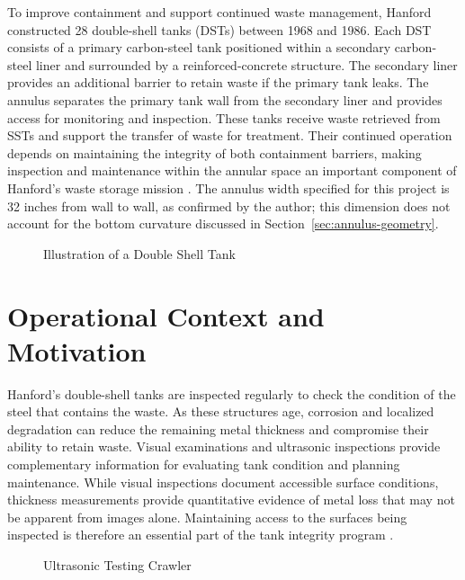 To improve containment and support continued waste management, Hanford constructed 28 double-shell tanks (DSTs) between 1968 and 1986. Each DST consists of a primary carbon-steel tank positioned within a secondary carbon-steel liner and surrounded by a reinforced-concrete structure. The secondary liner provides an additional barrier to retain waste if the primary tank leaks. The annulus separates the primary tank wall from the secondary liner and provides access for monitoring and inspection. These tanks receive waste retrieved from SSTs and support the transfer of waste for treatment. Their continued operation depends on maintaining the integrity of both containment barriers, making inspection and maintenance within the annular space an important component of Hanford's waste storage mission \citep{doe2024DoubleShellTanks}. The annulus width specified for this project is 32 inches from wall to wall, as confirmed by the author; this dimension does not account for the bottom curvature discussed in Section~\ref{sec:annulus-geometry}.

\begin{figure}[H]
\centering
{}
\caption{Illustration of a Double Shell Tank}
\label{fig:Illustration of a Double Shell Tank}
\end{figure}



\section{Operational Context and Motivation}
\label{sec:operational-context}
Hanford's double-shell tanks are inspected regularly to check the condition of the steel that contains the waste. As these structures age, corrosion and localized degradation can reduce the remaining metal thickness and compromise their ability to retain waste. Visual examinations and ultrasonic inspections provide complementary information for evaluating tank condition and planning maintenance. While visual inspections document accessible surface conditions, thickness measurements provide quantitative evidence of metal loss that may not be apparent from images alone. Maintaining access to the surfaces being inspected is therefore an essential part of the tank integrity program \citep{doe2024DoubleShellTanks,doe2020HanfordRoboticInspection}.

\begin{figure}[H]
\centering
{}
\caption{Ultrasonic Testing Crawler}
\label{fig:Ultrasonic Testing Crawler}
\end{figure}

